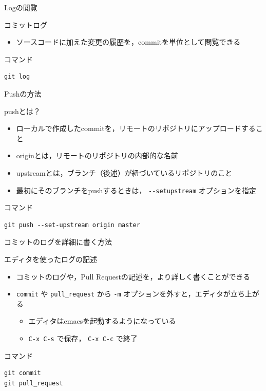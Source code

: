 \documentclass[t, aspectratio=169]{beamer}
\begin{document}
\begin{frame}[fragile,label=sec-2-3-5]{Logの閲覧}
 \begin{block}{コミットログ}
\begin{itemize}
\item ソースコードに加えた変更の履歴を，commitを単位として閲覧できる
\end{itemize}
\end{block}

\begin{block}{コマンド}
\begin{verbatim}
git log
\end{verbatim}
\end{block}
\end{frame}
\begin{frame}[fragile,label=sec-2-3-6]{Pushの方法}
 \begin{block}{pushとは？}
\begin{itemize}
\item ローカルで作成したcommitを，リモートのリポジトリにアップロードすること
\item originとは，リモートのリポジトリの内部的な名前
\item upstreamとは，ブランチ（後述）が紐づいているリポジトリのこと
\item 最初にそのブランチをpushするときは， \texttt{-{}-setupstream} オプションを指定
\end{itemize}
\end{block}

\begin{block}{コマンド}
\begin{verbatim}
git push --set-upstream origin master
\end{verbatim}
\end{block}
\end{frame}
\begin{frame}[fragile,label=sec-2-3-7]{コミットのログを詳細に書く方法}
 \begin{block}{エディタを使ったログの記述}
\begin{itemize}
\item コミットのログや，Pull Requestの記述を，より詳しく書くことができる
\item \texttt{commit} や \texttt{pull\_request} から  \texttt{-m} オプションを外すと，エディタが立ち上がる
\begin{itemize}
\item エディタはemacsを起動するようになっている
\item \texttt{C-x C-s} で保存， \texttt{C-x C-c} で終了
\end{itemize}
\end{itemize}
\end{block}

\begin{block}{コマンド}
\begin{verbatim}
git commit
git pull_request
\end{verbatim}
\end{block}
\end{frame}
\end{document}
